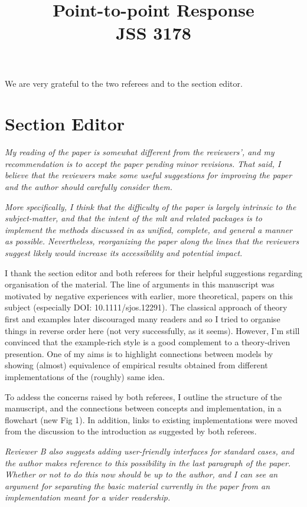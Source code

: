 \documentclass[12pt]{article}
\title{Point-to-point Response \\ JSS 3178}
\author{}
\begin{document}
\maketitle

We are very grateful to the two referees and to the section editor.


\section*{Section Editor}

\noindent
\textit{
My reading of the paper is somewhat different from the reviewers', and
my recommendation is to accept the paper pending minor revisions. That
said, I believe that the reviewers make some useful suggestions for
improving the paper and the author should carefully consider them.}

\textit{More specifically, I think that the difficulty of the paper is largely
intrinsic to the subject-matter, and that the intent of the mlt and
related packages is to implement the methods discussed in as unified,
complete, and general a manner as possible. Nevertheless, reorganizing
the paper along the lines that the reviewers suggest likely would
increase its accessibility and potential impact.}

I thank the section editor and both referees for their helpful suggestions
regarding organisation of the material. The line of arguments in this
manuscript was motivated by negative experiences with earlier, more
theoretical, papers on this subject (especially DOI: 10.1111/sjos.12291).
The classical approach of theory first and examples later discouraged many
readers and so I tried to organise things in reverse order here (not very
successfully, as it seems). However, I'm still convinced that the
example-rich style is a good complement to a theory-driven presention. One
of my aims is to highlight connections between models by showing (almost)
equivalence of empirical results obtained from different implementations of
the (roughly) same idea. 

To addess the concerns raised by both referees, I outline the structure of
the manuscript, and the connections between concepts and implementation, in
a flowchart (new Fig 1). In addition, links to existing implementations were
moved from the discussion to the introduction as suggested by both referees.

\textit{Reviewer B also suggests adding user-friendly interfaces for standard
cases, and the author makes reference to this possibility in the last
paragraph of the paper. Whether or not to do this now should be up to
the author, and I can see an argument for separating the basic material
currently in the paper from an implementation meant for a wider
readership.}
\end{document}
